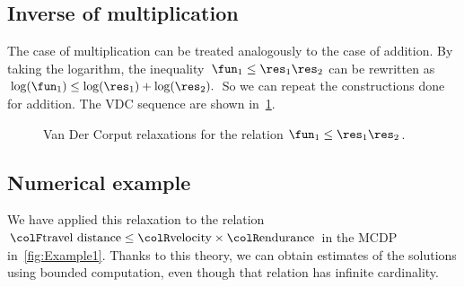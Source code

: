 \subsection{Inverse of multiplication}

The case of multiplication can be treated analogously to the case
of addition. By taking the logarithm, the inequality~$\fun_{1}\leq\res_{1}\res_{2}$
can be rewritten as~$\log(\fun_{1})\leq\log(\res_{1})+\log(\res_{2}).$
So we can repeat the constructions done for addition. The VDC sequence
are shown in~\cref{fig:approx_invmult}.

\begin{figure}[h]
  \begin{centering}
    \par
  \end{centering}
  \caption{\label{fig:approx_invmult}Van Der Corput relaxations for the relation
    $\fun_{1}\leq\res_{1}\res_{2}$.}
\end{figure}

\subsection{Numerical example}

We have applied this relaxation to the relation ${\colF\text{travel distance}}\leq{\colR\text{velocity}}\times{\colR\text{endurance}}$
in the MCDP in~\cref{fig:Example1}. Thanks to this theory,
we can obtain estimates of the solutions using bounded computation,
even though that relation has infinite cardinality.

